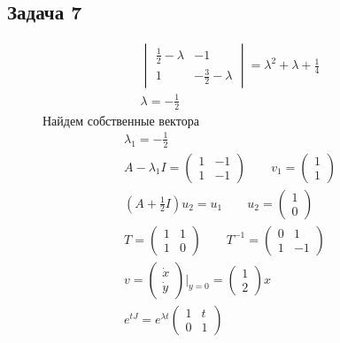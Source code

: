 \subsection*{Задача 7}
\begin{figure}[!h]
	\begin{minipage}[h]{0.49\linewidth}
		\begin{gather*}
			\begin{vmatrix}
				\frac{1}{2} - \lambda & -1\\
				1 & -\frac{3}{2} - \lambda
			\end{vmatrix}
			=
			\lambda^2 + \lambda + \frac{1}{4}\\
			\lambda = -\frac{1}{2}
		\end{gather*}
		Найдем собственные вектора
		\begin{gather*}
			\lambda_1 = -\frac{1}{2}\\
			A - \lambda_1 I =
			\begin{pmatrix}
				1 & -1\\
				1 & -1
			\end{pmatrix}\qquad
			v_1 =
			\begin{pmatrix}
				1 \\ 1
			\end{pmatrix}\\
			\left(A + \frac{1}{2}I\right)u_2 = u_1\qquad
			u_2 = 
			\begin{pmatrix}
				1 \\ 0
			\end{pmatrix}\\
			T =
			\begin{pmatrix}
				1 & 1\\
				1 & 0
			\end{pmatrix}\qquad
			T^{-1} =
			\begin{pmatrix}
				0 & 1\\
				1 & -1
			\end{pmatrix}\\
			v = 
			\begin{pmatrix}
				\dot{x} \\ \dot{y}
			\end{pmatrix}
			|_{y = 0}
			=
			\begin{pmatrix}
				1 \\ 2
			\end{pmatrix}x\\
			e^{tJ} = e^{\lambda t}
			\begin{pmatrix}
				1 & t\\
				0 & 1
			\end{pmatrix}\\

\end{gather*}
\end{minipage}
\end{figure}
